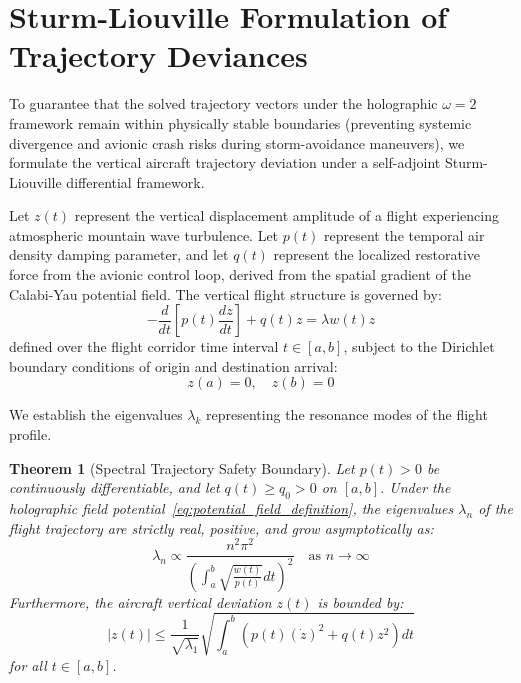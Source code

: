 \documentclass[11pt,a4paper]{book}
\newtheorem{theorem}{Theorem}
\begin{document}
\section{Sturm-Liouville Formulation of Trajectory Deviances}\label{sec:stability}

To guarantee that the solved trajectory vectors under the holographic $\omega=2$ framework remain within physically stable boundaries (preventing systemic divergence and avionic crash risks during storm-avoidance maneuvers), we formulate the vertical aircraft trajectory deviation under a self-adjoint Sturm-Liouville differential framework.

Let $z(t)$ represent the vertical displacement amplitude of a flight experiencing atmospheric mountain wave turbulence. Let $p(t)$ represent the temporal air density damping parameter, and let $q(t)$ represent the localized restorative force from the avionic control loop, derived from the spatial gradient of the Calabi-Yau potential field. The vertical flight structure is governed by:
\begin{equation}
\label{eq:sturm_differential}
-\frac{d}{dt}\left[ p(t) \frac{dz}{dt} \right] + q(t) z = \lambda w(t) z
\end{equation}
defined over the flight corridor time interval $t \in [a, b]$, subject to the Dirichlet boundary conditions of origin and destination arrival:
\begin{equation}
\label{eq:boundary_conditions}
z(a) = 0, \quad z(b) = 0
\end{equation}

We establish the eigenvalues $\lambda_k$ representing the resonance modes of the flight profile.

\begin{theorem}[Spectral Trajectory Safety Boundary]
Let $p(t) > 0$ be continuously differentiable, and let $q(t) \ge q_0 > 0$ on $[a, b]$. Under the holographic field potential~\eqref{eq:potential_field_definition}, the eigenvalues $\lambda_n$ of the flight trajectory are strictly real, positive, and grow asymptotically as:
\begin{equation}
\lambda_n \propto \frac{n^2 \pi^2}{\left( \int_a^b \sqrt{\frac{w(t)}{p(t)}} dt \right)^2} \quad \text{as } n \to \infty
\end{equation}
Furthermore, the aircraft vertical deviation $z(t)$ is bounded by:
\begin{equation}
|z(t)| \le \frac{1}{\sqrt{\lambda_1}} \sqrt{ \int_a^b \left( p(t) (\dot{z})^2 + q(t) z^2 \right) dt }
\end{equation}
for all $t \in [a, b]$.
\end{theorem}
\end{document}
